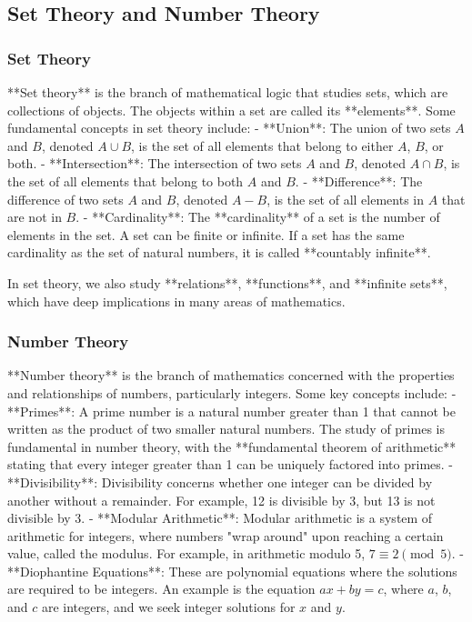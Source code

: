 \documentclass{article}
\begin{document}
\subsection{Set Theory and Number Theory}

\subsubsection*{Set Theory}

**Set theory** is the branch of mathematical logic that studies sets, which are collections of objects. The objects within a set are called its **elements**. Some fundamental concepts in set theory include:
- **Union**: The union of two sets \( A \) and \( B \), denoted \( A \cup B \), is the set of all elements that belong to either \( A \), \( B \), or both.
- **Intersection**: The intersection of two sets \( A \) and \( B \), denoted \( A \cap B \), is the set of all elements that belong to both \( A \) and \( B \).
- **Difference**: The difference of two sets \( A \) and \( B \), denoted \( A - B \), is the set of all elements in \( A \) that are not in \( B \).
- **Cardinality**: The **cardinality** of a set is the number of elements in the set. A set can be finite or infinite. If a set has the same cardinality as the set of natural numbers, it is called **countably infinite**.

In set theory, we also study **relations**, **functions**, and **infinite sets**, which have deep implications in many areas of mathematics.

\subsubsection*{Number Theory}

**Number theory** is the branch of mathematics concerned with the properties and relationships of numbers, particularly integers. Some key concepts include:
- **Primes**: A prime number is a natural number greater than 1 that cannot be written as the product of two smaller natural numbers. The study of primes is fundamental in number theory, with the **fundamental theorem of arithmetic** stating that every integer greater than 1 can be uniquely factored into primes.
- **Divisibility**: Divisibility concerns whether one integer can be divided by another without a remainder. For example, 12 is divisible by 3, but 13 is not divisible by 3.
- **Modular Arithmetic**: Modular arithmetic is a system of arithmetic for integers, where numbers "wrap around" upon reaching a certain value, called the modulus. For example, in arithmetic modulo 5, \( 7 \equiv 2 \pmod{5} \).
- **Diophantine Equations**: These are polynomial equations where the solutions are required to be integers. An example is the equation \( ax + by = c \), where \( a \), \( b \), and \( c \) are integers, and we seek integer solutions for \( x \) and \( y \).
\end{document}
